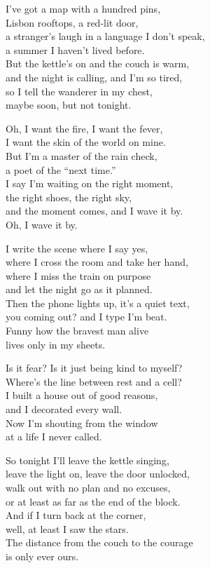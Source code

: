 \begin{lyrics}
I’ve got a map with a hundred pins,\\
Lisbon rooftops, a red-lit door,\\
a stranger’s laugh in a language I don’t speak,\\
a summer I haven’t lived before.\\
But the kettle’s on and the couch is warm,\\
and the night is calling, and I’m so tired,\\
so I tell the wanderer in my chest,\\
maybe soon, but not tonight.

Oh, I want the fire, I want the fever,\\
I want the skin of the world on mine.\\
But I’m a master of the rain check,\\
a poet of the “next time.”\\
I say I’m waiting on the right moment,\\
the right shoes, the right sky,\\
and the moment comes, and I wave it by.\\
Oh, I wave it by.

I write the scene where I say yes,\\
where I cross the room and take her hand,\\
where I miss the train on purpose\\
and let the night go as it planned.\\
Then the phone lights up, it’s a quiet text,\\
you coming out? and I type I’m beat.\\
Funny how the bravest man alive\\
lives only in my sheets.


Is it fear? Is it just being kind to myself?\\
Where’s the line between rest and a cell?\\
I built a house out of good reasons,\\
and I decorated every wall.\\
Now I’m shouting from the window\\
at a life I never called.

So tonight I’ll leave the kettle singing,\\
leave the light on, leave the door unlocked,\\
walk out with no plan and no excuses,\\
or at least as far as the end of the block.\\
And if I turn back at the corner,\\
well, at least I saw the stars.\\
The distance from the couch to the courage\\
is only ever ours.


\end{lyrics}
